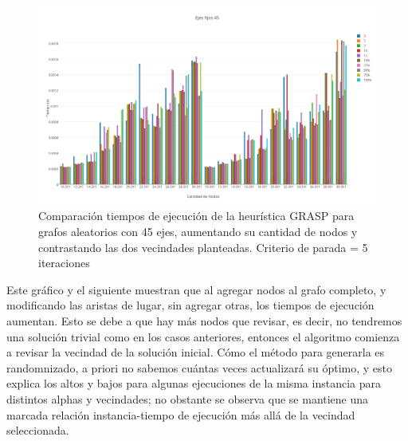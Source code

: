   \begin{figure}[h!]
   \begin{center}
 	\includegraphics[scale=0.35]{imagenes/grasp/45ejes-5repes.png}
 	\caption{Comparaci\'on tiempos de ejecuci\'on de la heur\'istica GRASP para grafos aleatorios con 45 ejes, aumentando su cantidad de nodos y contrastando las dos vecindades planteadas. Criterio de parada = 5 iteraciones}
   \end{center}
 \end{figure}
\newpage
Este gr\'afico y el siguiente muestran que al agregar nodos al grafo completo, y modificando las aristas de lugar, sin agregar otras, los tiempos de ejecuci\'on aumentan. Esto se debe a que hay m\'as nodos que revisar, es decir, no tendremos una soluci\'on trivial como en los casos anteriores, entonces el algoritmo comienza a revisar la vecindad de la soluci\'on inicial. C\'omo el m\'etodo para generarla es randomnizado, a priori no sabemos cu\'antas veces actualizar\'a su \'optimo, y esto explica los altos y bajos para algunas ejecuciones de la misma instancia para distintos alphas y vecindades; no obstante se observa que se mantiene una marcada relaci\'on instancia-tiempo de ejecuci\'on m\'as all\'a de la vecindad seleccionada.


